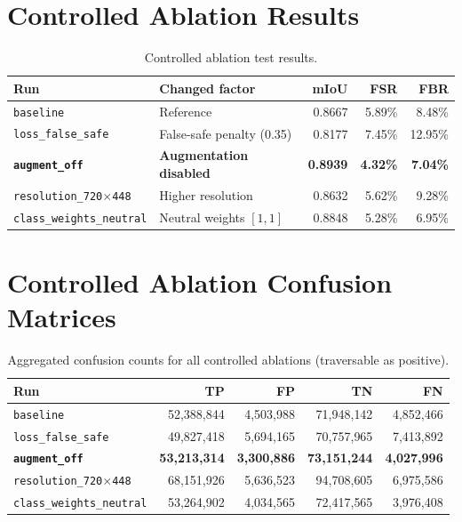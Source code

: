 \documentclass[12pt,a4paper]{report}
\begin{document}
\section{Controlled Ablation Results}

\begin{table}[H]
\centering
\caption{Controlled ablation test results.}
\label{tab:ablation_results}
\small
\begin{tabular}{@{}llrrr@{}}
\toprule
\textbf{Run} & \textbf{Changed factor} & \textbf{mIoU} & \textbf{FSR} & \textbf{FBR} \\
\midrule
\texttt{baseline}                  & Reference                  & 0.8667 & 5.89\% & 8.48\%  \\
\texttt{loss\_false\_safe}         & False-safe penalty (0.35)  & 0.8177 & 7.45\% & 12.95\% \\
\textbf{\texttt{augment\_off}}     & \textbf{Augmentation disabled} & \textbf{0.8939} & \textbf{4.32\%} & \textbf{7.04\%} \\
\texttt{resolution\_720$\times$448}  & Higher resolution          & 0.8632 & 5.62\% & 9.28\%  \\
\texttt{class\_weights\_neutral}   & Neutral weights $[1,1]$    & 0.8848 & 5.28\% & 6.95\%  \\
\bottomrule
\end{tabular}
\end{table}

\section{Controlled Ablation Confusion Matrices}

\begin{table}[H]
\centering
\caption{Aggregated confusion counts for all controlled ablations (traversable as positive).}
\label{tab:ablation_confusion}
\small
\begin{tabular}{@{}lrrrr@{}}
\toprule
\textbf{Run} & \textbf{TP} & \textbf{FP} & \textbf{TN} & \textbf{FN} \\
\midrule
\texttt{baseline}                  & 52{,}388{,}844 & 4{,}503{,}988 & 71{,}948{,}142 & 4{,}852{,}466 \\
\texttt{loss\_false\_safe}         & 49{,}827{,}418 & 5{,}694{,}165 & 70{,}757{,}965 & 7{,}413{,}892 \\
\textbf{\texttt{augment\_off}}     & \textbf{53{,}213{,}314} & \textbf{3{,}300{,}886} & \textbf{73{,}151{,}244} & \textbf{4{,}027{,}996} \\
\texttt{resolution\_720$\times$448}  & 68{,}151{,}926 & 5{,}636{,}523 & 94{,}708{,}605 & 6{,}975{,}586 \\
\texttt{class\_weights\_neutral}   & 53{,}264{,}902 & 4{,}034{,}565 & 72{,}417{,}565 & 3{,}976{,}408 \\
\bottomrule
\end{tabular}
\end{table}
\end{document}
